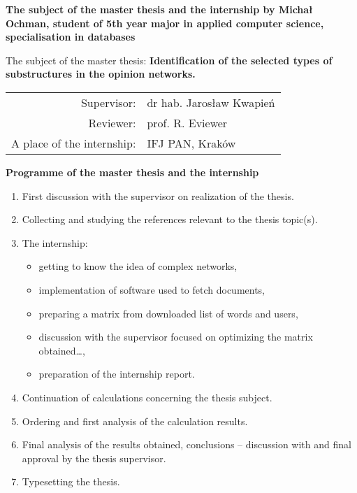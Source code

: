 \documentclass[a4paper,12pt]{article}
\begin{document}
{\newpage

\begin{center}
{\bf The subject of the master thesis and the internship by Michał Ochman,
student of 5th year major in applied computer science, specialisation in databases}\\
\end{center}

The subject of the master thesis:
{\bf Identification of the selected types of substructures in the opinion networks.}\\

\begin{tabular}{rl}
Supervisor:                     & dr hab. Jarosław Kwapień\\
Reviewer:                       & prof. R. Eviewer\\
A place of the internship:      & IFJ PAN, Kraków\\
\end{tabular}

\begin{center}
{\bf Programme of the master thesis and the internship}
\end{center}

\begin{enumerate}
\item First  discussion with the supervisor on realization of the thesis.
\item Collecting and studying the references relevant to the thesis topic(s).
\item The internship:
\begin{itemize}
\item getting to know the idea of complex networks,
\item implementation of software used to fetch documents,
\item preparing a matrix from downloaded list of words and users,
\item discussion with the supervisor focused on optimizing the matrix obtained\ldots,
\item preparation of the internship report.
\end{itemize}
\item Continuation of calculations concerning the thesis subject.
\item Ordering and first analysis of the calculation results.
\item Final analysis of the results obtained, conclusions -- discussion with and final approval by the thesis supervisor.
\item Typesetting the thesis.
\end{enumerate}


}
\end{document}
